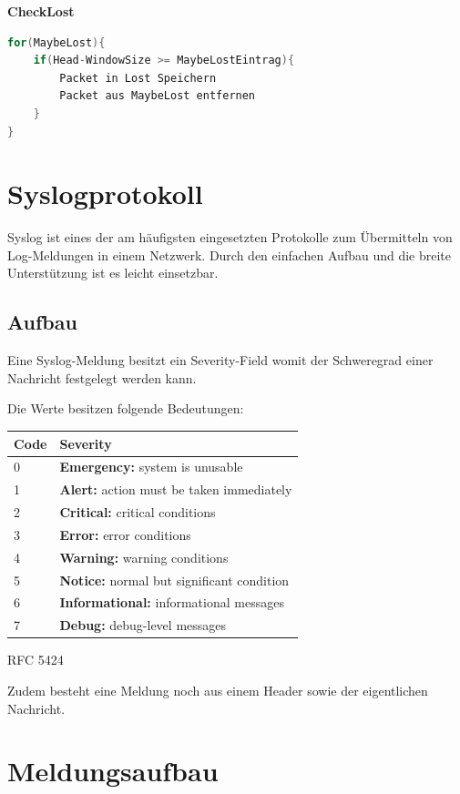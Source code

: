 \textbf{CheckLost}
\begin{lstlisting}[language=go]
for(MaybeLost){
	if(Head-WindowSize >= MaybeLostEintrag){
		Packet in Lost Speichern
		Packet aus MaybeLost entfernen
	}
}
\end{lstlisting}


\section{Syslogprotokoll}
\label{sec:Syslogprotokoll}

\noindent Syslog ist eines der am häufigsten eingesetzten Protokolle zum Übermitteln von Log-Meldungen in einem Netzwerk. Durch den einfachen Aufbau und die breite Unterstützung ist es leicht einsetzbar.


\subsection{ Aufbau}

\noindent Eine Syslog-Meldung besitzt ein Severity-Field womit der Schweregrad einer Nachricht festgelegt werden kann.

\noindent Die Werte besitzen folgende Bedeutungen:

\begin{tabular}{|p{0.5in}|p{3.7in}|} \hline 
Code & \textbf{Severity} \\ \hline 
0 & \textbf{Emergency:} system is unusable \\ \hline 
1 & \textbf{Alert:} action must be taken immediately \\ \hline 
2 & \textbf{Critical:} critical conditions \\ \hline 
3 & \textbf{Error:} error conditions \\ \hline 
4 & \textbf{Warning:} warning conditions \\ \hline 
5 & \textbf{Notice:} normal but significant condition \\ \hline 
6 & \textbf{Informational:} informational messages \\ \hline 
7 & \textbf{Debug:} debug-level messages \\ \hline 
\end{tabular}

RFC 5424

\noindent Zudem besteht eine Meldung noch aus einem Header sowie der eigentlichen Nachricht.

\noindent 


\section{ Meldungsaufbau}

